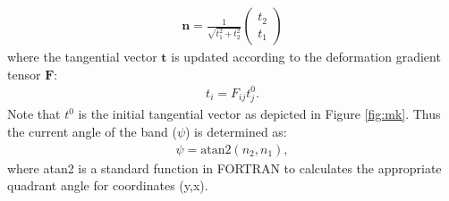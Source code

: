 \documentclass[12pt]{amsart}
\begin{document}
\begin{eqnarray}
  \label{eq:fpsi_update1}
  \boldsymbol{n}=\frac{1}{\sqrt{t_1^2+t_2^2}}
  \begin{pmatrix}
    t_2\\
    t_1
  \end{pmatrix}
\end{eqnarray}
where the tangential vector $\boldsymbol{t}$ is updated according to the deformation gradient tensor $\boldsymbol{F}$:
\begin{eqnarray}
  \label{eq:fpsi_update2}
t_i = F_{ij} t^0_j.
\end{eqnarray}
Note that $t^0$ is the initial tangential vector as depicted in Figure \ref{fig:mk}.
Thus the current angle of the band ($\psi$) is determined as:
\begin{eqnarray}
  \label{eq:fpsi_update3}
  \psi = \text{atan2}(n_2,n_1),
\end{eqnarray}
where atan2 is a standard function in FORTRAN to calculates the appropriate quadrant angle for coordinates (y,x).
\end{document}
